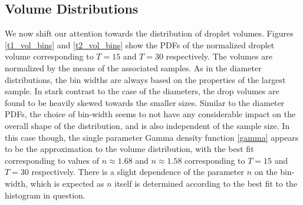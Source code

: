 \subsection*{Volume Distributions}

We now shift our attention towards the distribution of droplet volumes. 
Figures \ref{t1_vol_bins} and \ref{t2_vol_bins} show the PDFs 
of the normalized droplet volume corresponding to $T=15$ and $T=30$ respectively. 
The volumes are normalized by the means of the associated samples. 
As in the diameter distributions, the bin widths are always 
based on the properties of the largest sample.
In stark contrast to the case of the diameters, the drop volumes
are found to be heavily skewed towards the smaller sizes.
Similar to the diameter PDFs, the choice of bin-width seems to not have any considerable impact
on the overall shape of the distribution, and is also independent of the sample size.   
In this case though, the single parameter Gamma density function \eqref{gamma} appears to
be the approximation to the volume distribution, with the best fit corresponding to 
values of $n \approx 1.68$ and $n \approx 1.58$ corresponding to $T=15$ and $T=30$ respectively.
There is a slight dependence of the parameter $n$ on the bin-width, which is expected 
as $n$ itself is determined according to the best fit to the histogram in question.


